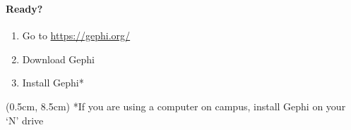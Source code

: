 \documentclass[8pt]{beamer}
\begin{document}

\begin{frame}
\frametitle{\insertsection}
\framesubtitle{Ready?}

\begin{enumerate}
	\item Go to \url{https://gephi.org/}
	\item Download Gephi
	\item Install Gephi* 
\end{enumerate}

\begin{textblock*}{8cm}(0.5cm, 8.5cm)
\scriptsize{*If you are using a computer on campus, install Gephi on your `N' drive}
\end{textblock*}

\end{frame}


\end{document}
